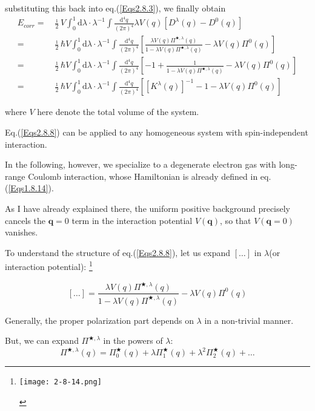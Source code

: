 substituting this back into eq.(\ref{Eqs2.8.3}), we finally obtain
\begin{eqnarray}
E_{corr} =& \frac{\imath}{2} V \int_0^1 \mathrm{d}\lambda \cdot \lambda^{-1} \int \frac{\mathrm{d}^4 q}{(2\pi)^4} \lambda V(q) [D^{\lambda}(q)-D^0(q)]\nonumber\\
=& \frac{\imath}{2} \hbar V \int_0^1 \mathrm{d}\lambda \cdot \lambda^{-1} \int \frac{\mathrm{d}^4 q}{(2\pi)^4} \left[ \frac{\lambda V(q)\Pi^{\bigstar,\lambda}(q)}{1-\lambda V(q)\Pi^{\bigstar,\lambda}(q)} - \lambda V(q)\Pi^0(q) \right] \label{Eqs2.8.7}\\
=& \frac{\imath}{2} \hbar V \int_0^1 \mathrm{d}\lambda \cdot \lambda^{-1} \int \frac{\mathrm{d}^4 q}{(2\pi)^4} \left[ -1 + \frac{1}{1-\lambda V(q)\Pi^{\bigstar,\lambda}(q)} - \lambda V(q)\Pi^0(q) \right] \nonumber\\
=&\frac{\imath}{2} \hbar V \int_0^1 \mathrm{d}\lambda \cdot \lambda^{-1} \int \frac{\mathrm{d}^4 q}{(2\pi)^4} \left[ \left[ K^{\lambda}(q) \right]^{-1} - 1 - \lambda V(q)\Pi^0(q) \right] \label{Eqs2.8.8}
\end{eqnarray}

where $V$ here denote the total volume of the system.

Eq.(\ref{Eqs2.8.8}) can be applied to any homogeneous system with spin-independent interaction.

In the following, however, we specialize to a degenerate electron gas with long-range Coulomb interaction, whose Hamiltonian is already defined in eq.(\ref{Eqs1.8.14}).

As I have already explained there, the uniform positive background precisely cancels the $\mathbf{q}=0$ term in the interaction potential $V(\mathbf{q})$, so that $V(\mathbf{q}=0)$ vanishes.

To understand the structure of eq.(\ref{Eqs2.8.8}), let us expand $\left[ \ldots \right]$ in $\lambda$(or interaction potential):
\footnote{\begin{center} \label{Fig2.8.14}
\texttt{[image: 2-8-14.png]}
\end{center}}

\[[\ldots] = \frac{\lambda V(q)\Pi^{\bigstar,\lambda}(q)}{1-\lambda V(q)\Pi^{\bigstar,\lambda}(q)} - \lambda V(q)\Pi^0(q)\]

Generally, the proper polarization part depends on $\lambda$ in a non-trivial manner.

But, we can expand $\Pi^{\bigstar,\lambda}$ in the powers of $\lambda$:
\[ \Pi^{\bigstar,\lambda}(q) = \Pi^{\bigstar}_0(q) + \lambda\Pi^{\bigstar}_1(q)+\lambda^2 \Pi^{\bigstar}_2(q) + \ldots \]

